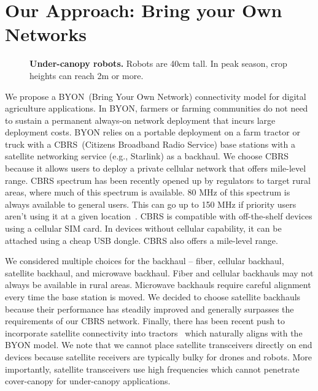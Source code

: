 \section{Our Approach: Bring your Own Networks}
\label{sec:approach}

\begin{figure*}[!ht] %
  \centering
  \hfill
  \hfill
  \hfill
  \vspace{-0.15in}
  \caption{\textbf{Under-canopy robots.} Robots are 40cm tall. In peak season, crop heights can reach 2m or more. }
  \label{fig:under-canopy}
  \vspace{-0.2in}
\end{figure*}


We propose a BYON~(Bring Your Own Network) connectivity model for digital agriculture applications. In BYON, farmers or farming communities do not need to sustain a permanent always-on network deployment that incurs large deployment costs. BYON relies on a portable deployment on a farm tractor or truck with a CBRS~(Citizens Broadband Radio Service) base stations with a satellite networking service (e.g., Starlink) as a backhaul. We choose CBRS because it allows users to deploy a private cellular network that offers mile-level range. CBRS spectrum has been recently opened up by regulators to target rural areas, where much of this spectrum is available. 80 MHz of this spectrum is always available to general users. This can go up to 150 MHz if priority users aren't using it at a given location~\cite{cbrs}. CBRS is compatible with off-the-shelf devices using a cellular SIM card. In devices without cellular capability, it can be attached using a cheap USB dongle. CBRS also offers a mile-level range.

We considered multiple choices for the backhaul -- fiber, cellular backhaul, satellite backhaul, and microwave backhaul. Fiber and cellular backhauls may not always be available in rural areas. Microwave backhauls require careful alignment every time the base station is moved. We decided to choose satellite backhauls because their performance has steadily improved and generally surpasses the requirements of our CBRS network. Finally, there has been recent push to incorporate satellite connectivity into tractors~\cite{deerespacex} which naturally aligns with the BYON model. We note that we cannot place satellite transceivers directly on end devices because  %
satellite receivers are typically bulky for drones and robots. More importantly, satellite transceivers use high frequencies which cannot penetrate cover-canopy for under-canopy applications.

